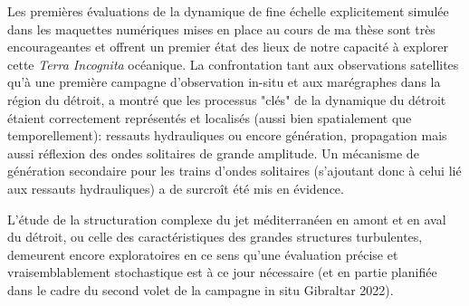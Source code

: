 

Les premières évaluations de la dynamique de fine échelle explicitement simulée dans les maquettes numériques mises en place au cours de ma thèse sont très encourageantes et offrent un premier état des lieux de notre capacité à explorer cette \textit{Terra Incognita} océanique. La confrontation tant aux observations satellites qu'à une première campagne d'observation in-situ et aux marégraphes dans la région du détroit, a montré que les processus "clés" de la dynamique du détroit étaient correctement représentés et localisés (aussi bien spatialement que temporellement): ressauts hydrauliques ou encore génération, propagation mais aussi réflexion des ondes solitaires de grande amplitude. Un mécanisme de génération secondaire pour les trains d'ondes solitaires (s'ajoutant donc à celui lié aux ressauts hydrauliques) a de surcroît été mis en évidence.

L'étude de la structuration complexe du jet méditerranéen en amont et en aval du détroit, ou celle des caractéristiques des grandes structures turbulentes, demeurent encore exploratoires en ce sens qu'une évaluation précise et vraisemblablement stochastique est à ce jour nécessaire (et en partie planifiée dans le cadre du second volet de la campagne in situ Gibraltar 2022).\\

